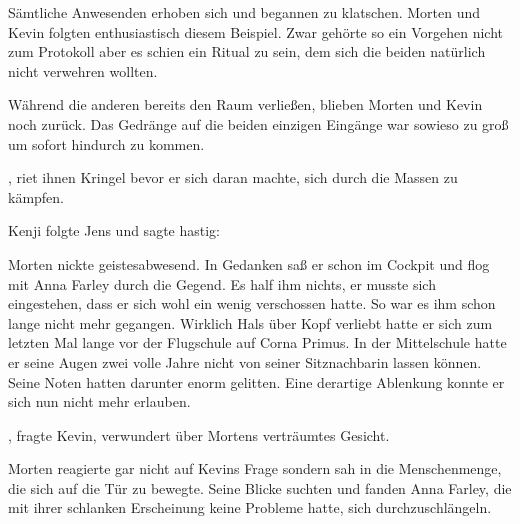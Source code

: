 \par

Sämtliche Anwesenden erhoben sich und begannen zu klatschen. Morten und Kevin folgten enthusiastisch diesem Beispiel. Zwar gehörte so ein Vorgehen nicht zum Protokoll aber es schien ein Ritual zu sein, dem sich die beiden natürlich nicht verwehren wollten.

\par

Während die anderen bereits den Raum verließen, blieben Morten und Kevin noch zurück. Das Gedränge auf die beiden einzigen Eingänge war sowieso zu groß um sofort hindurch zu kommen.

\par

, riet ihnen Kringel bevor er sich daran machte, sich durch die Massen zu kämpfen.

\par

Kenji folgte Jens und sagte hastig: 

\par

Morten nickte geistesabwesend. In Gedanken saß er schon im Cockpit und flog mit Anna Farley durch die Gegend. Es half ihm nichts, er musste sich eingestehen, dass er sich wohl ein wenig verschossen hatte. So war es ihm schon lange nicht mehr gegangen. Wirklich Hals über Kopf verliebt hatte er sich zum letzten Mal lange vor der Flugschule auf Corna Primus. In der Mittelschule hatte er seine Augen zwei volle Jahre nicht von seiner Sitznachbarin lassen können. Seine Noten hatten darunter enorm gelitten. Eine derartige Ablenkung konnte er sich nun nicht mehr erlauben.

\par

, fragte Kevin, verwundert über Mortens verträumtes Gesicht. 

\par

Morten reagierte gar nicht auf Kevins Frage sondern sah in die Menschenmenge, die sich auf die Tür zu bewegte. Seine Blicke suchten und fanden Anna Farley, die mit ihrer schlanken Erscheinung keine Probleme hatte, sich durchzuschlängeln.

